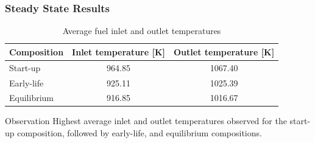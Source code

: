 \begin{frame}
	\frametitle{Steady State Results}
			\begin{table}[b]
				\small
				\centering
				\caption{Average fuel inlet and outlet temperatures}
				\begin{tabular}{lcc}
					\hline
					{Composition} & {Inlet temperature [K]} & {Outlet
					temperature [K]}\\
					\hline
					Start-up & 964.85 & 1067.40\\
					Early-life & 925.11 & 1025.39\\
					Equilibrium & 916.85 & 1016.67\\
					\hline
				\end{tabular}
				\label{table:inlet}
			\end{table}
		
		\vspace{.3cm}
		\begin{block}{Observation}
		Highest average inlet and outlet temperatures observed for the
		start-up composition, followed by early-life, and equilibrium
		compositions.
		\end{block}
\end{frame}

